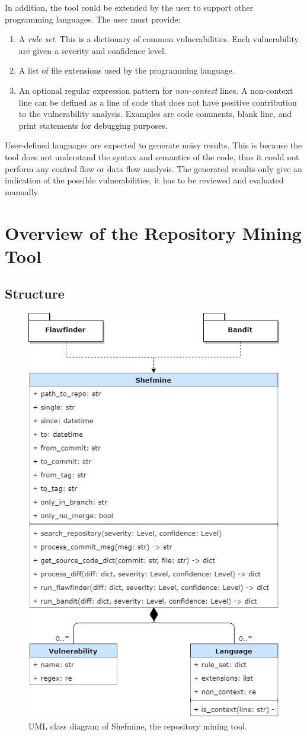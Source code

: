 \documentclass[12pt, a4paper]{report}
\begin{document}
In addition, the tool could be extended by the user to support other programming languages. The user
must provide:
\begin{enumerate}
  \item A \textit{rule set}. This is a dictionary of common vulnerabilities. Each vulnerability are
  given a severity and confidence level.
  \item A list of file extensions used by the programming language.
  \item An optional regular expression pattern for \textit{non-context} lines. A non-context line
  can be defined as a line of code that does not have positive contribution to the vulnerability
  analysis. Examples are code comments, blank line, and print statements for debugging purposes.
\end{enumerate}

User-defined languages are expected to generate noisy results. This is because the tool does not
understand the syntax and semantics of the code, thus it could not perform any control flow or data
flow analysis. The generated results only give an indication of the possible vulnerabilities, it has
to be reviewed and evaluated manually.

\section{Overview of the Repository Mining Tool}
\subsection{Structure}
\begin{figure}[H]
  \centering
  \includegraphics[width=.65\linewidth]{images/class_diagram.png}
  \caption{UML class diagram of Shefmine, the repository mining tool.}
  \label{figure:class_diagram}
\end{figure}
\end{document}
